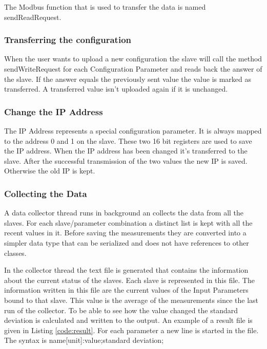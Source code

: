 The Modbus function that is used to transfer the data is named sendReadRequest.

\subsubsection{Transferring the configuration} %
\label{ssub:transferring_the_configuration}
When the user wants to upload a new configuration the slave will call the method sendWriteRequest for each Configuration Parameter and reads back the answer of the slave. If the answer equals the previously sent value the value is marked as transferred. A transferred value isn't uploaded again if it is unchanged.
\subsubsection{Change the IP Address} %
\label{ssub:change_the_ip_address}
The IP Address represents a special configuration parameter. It is always mapped to the address 0 and 1 on the slave. These two 16 bit registers are used to save the IP address. When the IP address has been changed it's transferred to the slave. After the successful transmission of the two values the new IP is saved. Otherwise the old IP is kept.


\subsubsection{Collecting the Data} %
\label{ssub:collecting_the_data}
A data collector thread runs in background an collects the data from all the slaves. For each slave/parameter combination a distinct list is kept with all the recent values in it. Before saving the measurements they are converted into a simpler data type that can be serialized and does not have references to other classes.

In the collector thread the text file is generated that contains the information about the current status of the slaves. Each slave is represented in this file. The information written in this file are the current values of the Input Parameters bound to that slave. This value is the average of the measurements since the last run of the collector. To be able to see how the value changed the standard deviation is calculated and written to the output. An example of a result file is given in  Listing \ref{code:result}. 
For each parameter a new line is started in the file. The syntax is {\C name[unit]:value;standard deviation;}

